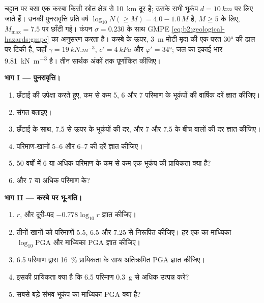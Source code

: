 \begin{problem}[{सप्ताहांत समस्या --- एक भ्रंश और एक ढाल के बीच एक कस्बा}]\label{pb:b2:geological-hazards:1}
चट्टान पर बसा एक कस्बा किसी स्रोत क्षेत्र से \qty{10}{km} दूर है; उसके सभी भूकंप
$d = \qty{10}{km}$ पर लिए जाते हैं। उनकी पुनरावृत्ति प्रति वर्ष $\log_{10} N(\geq M) = 4.0 - 1.0\,M$ है, $M \geq 5$ के लिए,
$M_{\max} = 7.5$ पर छाँटी गई। कंपन $\sigma = 0.230$ के साथ GMPE \eqref{eq:b2:geological-hazards:gmpe}
का अनुसरण करता है। कस्बे के ऊपर, \qty{3}{m} मोटी मृदा की एक परत \ang{30} की ढाल पर टिकी है,
जहाँ $\gamma = \qty{19}{kN.m^{-3}}$, $c' = \qty{4}{kPa}$ और $\varphi' = \ang{34}$; जल का इकाई
भार \qty{9.81}{kN.m^{-3}} है। तीन सार्थक अंकों तक पूर्णांकित कीजिए।

\noindent\textbf{भाग I --- पुनरावृत्ति।}
\begin{enumerate}
  \item छँटाई की उपेक्षा करते हुए, कम से कम 5, 6 और 7 परिमाण के भूकंपों की वार्षिक दरें
        ज्ञात कीजिए।
  \item संगत  बताइए।
  \item छँटाई के साथ, 7.5 से ऊपर के भूकंपों की दर, और 7
        और 7.5 के बीच वालों की दर ज्ञात कीजिए।
  \item परिमाण-खानों 5--6 और 6--7 की दरें ज्ञात कीजिए।
  \item 50 वर्षों में 6 या अधिक परिमाण के कम से कम एक भूकंप की प्रायिकता क्या है?
  \item और 7 या अधिक परिमाण के?
\end{enumerate}

\noindent\textbf{भाग II --- कस्बे पर भू-गति।}
\begin{enumerate}[resume]
  \item $r$, और दूरी-पद $-0.778\log_{10} r$ ज्ञात कीजिए।
  \item तीनों खानों को परिमाणों 5.5, 6.5 और 7.25 से निरूपित कीजिए। हर एक का माध्यिका
        $\log_{10}\mathrm{PGA}$ और माध्यिका PGA ज्ञात कीजिए।
  \item 6.5 परिमाण द्वारा \qty{16}{\percent} प्रायिकता के साथ अतिक्रमित PGA ज्ञात कीजिए।
  \item इसकी प्रायिकता क्या है कि 6.5 परिमाण \qty{0.3}{g} से अधिक उत्पन्न करे?
  \item सबसे बड़े संभव भूकंप का माध्यिका PGA क्या है?
\end{enumerate}


\end{problem}
